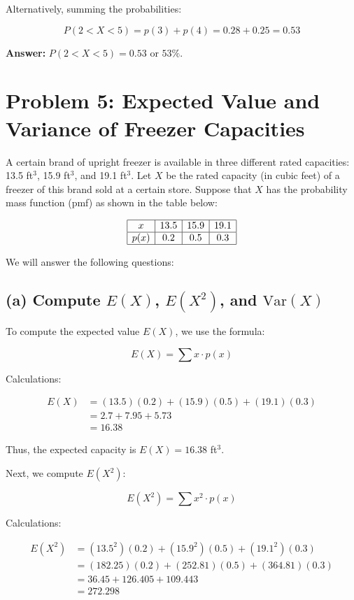 \documentclass{article}
\begin{document}
Alternatively, summing the probabilities:

\[
P(2 < X < 5) = p(3) + p(4) = 0.28 + 0.25 = 0.53
\]

\textbf{Answer:} \( P(2 < X < 5) = 0.53 \) or \( 53\% \).


\section*{Problem 5: Expected Value and Variance of Freezer Capacities}

A certain brand of upright freezer is available in three different rated capacities: 13.5 ft\(^3\), 15.9 ft\(^3\), and 19.1 ft\(^3\). Let \(X\) be the rated capacity (in cubic feet) of a freezer of this brand sold at a certain store. Suppose that \(X\) has the probability mass function (pmf) as shown in the table below:

\[
\begin{array}{|c|c|c|c|}
\hline
x & 13.5 & 15.9 & 19.1 \\
\hline
p(x) & 0.2 & 0.5 & 0.3 \\
\hline
\end{array}
\]

We will answer the following questions:

\subsection*{(a) Compute \( E(X) \), \( E(X^2) \), and \( \text{Var}(X) \)}

To compute the expected value \( E(X) \), we use the formula:

\[
E(X) = \sum x \cdot p(x)
\]

Calculations:

\[
\begin{aligned}
E(X) &= (13.5)(0.2) + (15.9)(0.5) + (19.1)(0.3) \\
&= 2.7 + 7.95 + 5.73 \\
&= 16.38
\end{aligned}
\]

Thus, the expected capacity is \( E(X) = 16.38 \) ft\(^3\).

Next, we compute \( E(X^2) \):

\[
E(X^2) = \sum x^2 \cdot p(x)
\]

Calculations:

\[
\begin{aligned}
E(X^2) &= (13.5^2)(0.2) + (15.9^2)(0.5) + (19.1^2)(0.3) \\
&= (182.25)(0.2) + (252.81)(0.5) + (364.81)(0.3) \\
&= 36.45 + 126.405 + 109.443 \\
&= 272.298
\end{aligned}
\]
\end{document}
